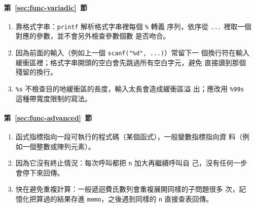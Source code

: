 \paragraph{第~\ref{sec:func-variadic}~節}
\begin{enumerate}
\item 靠格式字串：\texttt{printf} 解析格式字串裡每個 \texttt{\%} 轉義
序列，依序從 \texttt{...} 裡取一個對應的參數，並不會另外檢查參數個數
是否吻合。
\item 因為前面的輸入（例如上一個 \texttt{scanf("\%d", ...)}）常留下一
個換行符在輸入緩衝區裡；格式字串開頭的空白會先跳過所有空白字元，避免
直接讀到那個殘留的換行。
\item \texttt{\%s} 不檢查目的地緩衝區的長度，輸入太長會造成緩衝區溢
出；應改用 \texttt{\%99s} 這種帶寬度限制的寫法。
\end{enumerate}

\paragraph{第~\ref{sec:func-advanced}~節}
\begin{enumerate}
\item 函式指標指向一段可執行的程式碼（某個函式），一般變數指標指向資
料（例如一個整數或陣列元素）。
\item 因為它沒有終止情況：每次呼叫都把 \texttt{n} 加大再繼續呼叫自
己，沒有任何一步會停下來回傳。
\item 快在避免重複計算：一般遞迴費氏數列會重複展開同樣的子問題很多
次，記憶化把算過的結果存進 \texttt{memo}，之後遇到同樣的 \texttt{n}
直接查表回傳。
\end{enumerate}

